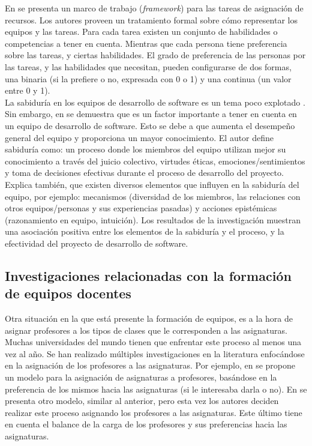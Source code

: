En \cite{Anagnostopoulos2010} se presenta un marco de trabajo (\textit{framework}) para las tareas de asignación de recursos. Los autores proveen un tratamiento formal sobre cómo representar los equipos y las tareas. Para cada tarea existen un conjunto de habilidades o competencias a tener en cuenta. Mientras que cada persona tiene preferencia sobre las tareas, y ciertas habilidades. El grado de preferencia de las personas por las tareas, y las habilidades que necesitan, pueden configurarse de dos formas, una binaria (si la prefiere o no, expresada con 0 o 1) y una continua (un valor entre 0 y 1).\\


La sabiduría en los equipos de desarrollo de software es un tema poco explotado \cite{Akguen2020}. Sin embargo, en \cite{Akguen2020} se demuestra que es un factor importante a tener en cuenta en un equipo de desarrollo de software. Esto se debe a que aumenta el desempeño general del equipo y proporciona un mayor conocimiento. El autor define sabiduría como: un proceso donde los miembros del equipo utilizan mejor su conocimiento a través del juicio colectivo, virtudes éticas, emociones/sentimientos y toma de decisiones efectivas durante el proceso de desarrollo del proyecto. Explica también, que existen diversos elementos que influyen en la sabiduría del equipo, por ejemplo: mecanismos (diversidad de los miembros, las relaciones con otros equipos/personas y sus experiencias pasadas) y acciones epistémicas (razonamiento en equipo, intuición). Los resultados de la investigación muestran una asociación positiva entre los elementos de la sabiduría y el proceso, y la efectividad del proyecto de desarrollo de software.

\subsection{Investigaciones relacionadas con la formación de equipos docentes}

Otra situación en la que está presente la formación de equipos, es a la hora de asignar profesores a los tipos de clases que le corresponden a las asignaturas. Muchas universidades del mundo tienen que enfrentar este proceso al menos una vez al año. Se han realizado múltiples investigaciones en la literatura enfocándose en la asignación de los profesores a las asignaturas. Por ejemplo, en \cite{Bosquez2020} se propone un modelo para la asignación de asignaturas a profesores, basándose en la preferencia de los mismos hacia las asignaturas (si le interesaba darla o no). En \cite{Domenech2014} se presenta otro modelo, similar al anterior, pero esta vez los autores deciden realizar este proceso asignando los profesores a las asignaturas. Este último tiene en cuenta el balance de la carga de los profesores y sus preferencias hacia las asignaturas.\\

